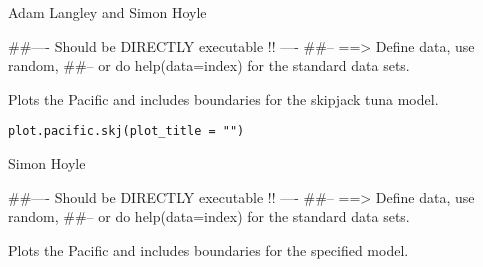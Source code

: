 \documentclass[a4paper]{book}
\begin{document}
%
\begin{Author}\relax

Adam Langley and Simon Hoyle
\end{Author}
%
\begin{Examples}
\begin{ExampleCode}
##---- Should be DIRECTLY executable !! ----
##-- ==>  Define data, use random,
##--	or do  help(data=index)  for the standard data sets.

\end{ExampleCode}
\end{Examples}
%
\begin{Description}\relax

Plots the Pacific and includes boundaries for the skipjack tuna model. 
\end{Description}
%
\begin{Usage}
\begin{verbatim}
plot.pacific.skj(plot_title = "")
\end{verbatim}
\end{Usage}
%
\begin{Arguments}
\begin{ldescription}
\item[\code{plot\_title}] 


\end{ldescription}
\end{Arguments}
%
\begin{Author}\relax

Simon Hoyle
\end{Author}
%
\begin{Examples}
\begin{ExampleCode}
##---- Should be DIRECTLY executable !! ----
##-- ==>  Define data, use random,
##--	or do  help(data=index)  for the standard data sets.

\end{ExampleCode}
\end{Examples}
%
\begin{Description}\relax

Plots the Pacific and includes boundaries for the specified model. 
\end{Description}
\end{document}
